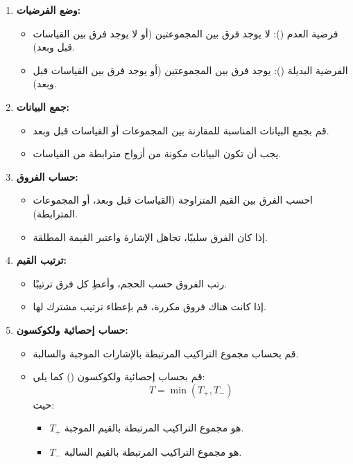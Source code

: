 \begin{enumerate}
	\item \textbf{وضع الفرضيات:}
	\begin{itemize}
		\item فرضية العدم (): لا يوجد فرق بين المجموعتين (أو لا يوجد فرق بين القياسات قبل وبعد).
		\item الفرضية البديلة (): يوجد فرق بين المجموعتين (أو يوجد فرق بين القياسات قبل وبعد).
	\end{itemize}
	
	\item \textbf{جمع البيانات:}
	\begin{itemize}
		\item قم بجمع البيانات المناسبة للمقارنة بين المجموعات أو القياسات قبل وبعد.
		\item يجب أن تكون البيانات مكونة من أزواج مترابطة من القياسات.
	\end{itemize}
	
	\item \textbf{حساب الفروق:}
	\begin{itemize}
		\item احسب الفرق بين القيم المتزاوجة (القياسات قبل وبعد، أو المجموعات المترابطة).
		\item إذا كان الفرق سلبيًا، تجاهل الإشارة واعتبر القيمة المطلقة.
	\end{itemize}
	
	\item \textbf{ترتيب القيم:}
	\begin{itemize}
		\item رتب الفروق حسب الحجم، وأعطِ كل فرق ترتيبًا.
		\item إذا كانت هناك فروق مكررة، قم بإعطاء ترتيب مشترك لها.
	\end{itemize}
	
	\item \textbf{حساب إحصائية ولكوكسون:}
	\begin{itemize}
		\item قم بحساب مجموع التراكيب المرتبطة بالإشارات الموجبة والسالبة.
		\item قم بحساب إحصائية ولكوكسون () كما يلي:
		\[
		T = \min(T_+ , T_-)
		\]
		حيث:
		\begin{itemize}
			\item \( T_+ \) هو مجموع التراكيب المرتبطة بالقيم الموجبة.
			\item \( T_- \) هو مجموع التراكيب المرتبطة بالقيم السالبة.
		\end{itemize}
	\end{itemize}
	

\end{enumerate}
